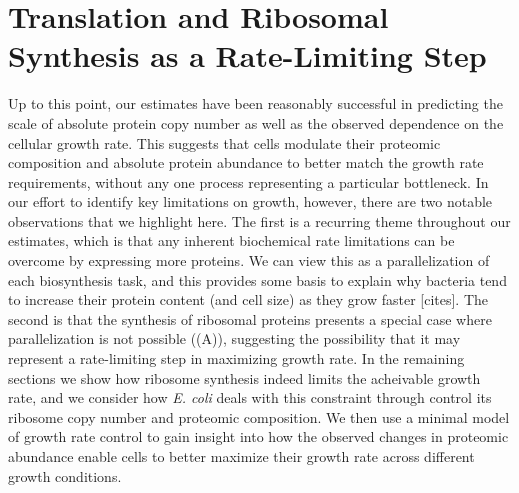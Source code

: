 \section{Translation and Ribosomal Synthesis as a Rate-Limiting Step}
Up to this point, our estimates have been reasonably successful in predicting
the scale of absolute protein copy number as well as the observed dependence on
the cellular growth rate. This suggests that cells modulate their proteomic
composition and absolute protein abundance to better match the growth rate
requirements, without any one process representing a particular bottleneck. In
our effort to identify key limitations on growth, however, there are two notable
observations that we highlight here. The first is a recurring theme throughout
our estimates, which is that any inherent biochemical rate
limitations can be overcome by expressing more proteins. We can view this as a
parallelization of each biosynthesis task, and this provides some basis to
explain why bacteria tend to increase their protein content (and cell size) as
they grow faster [cites]. The second is that the synthesis of ribosomal proteins
presents a special case where parallelization is not possible
((A)), suggesting the possibility that it may represent a
rate-limiting step in maximizing growth rate. In the remaining sections we
show how ribosome synthesis indeed limits the acheivable growth rate, and we
consider how \textit{E. coli} deals with this constraint through control its
ribosome copy number and proteomic composition.  We then use a minimal model of
growth rate control to gain insight into how the observed changes in proteomic
abundance enable cells to better maximize their growth rate across different
growth conditions.


